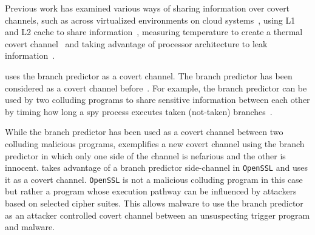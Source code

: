 Previous work has examined various ways of sharing information over covert
channels, such as across virtualized environments on cloud
systems~\cite{wu2012whispers}, using L1 and L2 cache to share
information~\cite{percival2005cache}, measuring temperature to create a thermal
covert channel~\cite{masti2015thermal, bartolini2016capacity} and taking
advantage of processor architecture to leak information~\cite{wang2006covert}.

\speculake uses the branch predictor as a covert channel. The branch predictor
has been considered as a covert channel
before~\cite{evtyushkin2016understanding}. For example, the branch predictor can
be used by two colluding programs to share sensitive information between each
other by timing how long a spy process executes taken (not-taken)
branches~\cite{evtyushkin2015covert}.

While the branch predictor has been used as a covert channel between two
colluding malicious programs, \speculake exemplifies a new covert channel using
the branch predictor in which only one side of the channel is nefarious and the
other is innocent. \speculake takes advantage of a branch predictor side-channel
in \texttt{OpenSSL} and uses it as a covert channel. \texttt{OpenSSL} is not a
malicious colluding program in this case but rather a program whose execution
pathway can be influenced by attackers based on selected cipher suites. This
allows malware to use the branch predictor as an attacker controlled covert
channel between an unsuspecting trigger program and \speculake malware.




